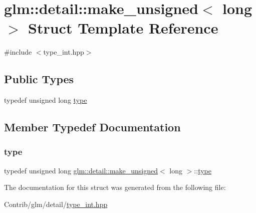 \hypertarget{structglm_1_1detail_1_1make__unsigned_3_01long_01_4}{}\section{glm\+:\+:detail\+:\+:make\+\_\+unsigned$<$ long $>$ Struct Template Reference}
\label{structglm_1_1detail_1_1make__unsigned_3_01long_01_4}


{\ttfamily \#include $<$type\+\_\+int.\+hpp$>$}

\subsection*{Public Types}
\begin{DoxyCompactItemize}
\item 
typedef unsigned long \mbox{\hyperlink{structglm_1_1detail_1_1make__unsigned_3_01long_01_4_ade0cc74f63e30969e7d7b42eb6ac8289}{type}}
\end{DoxyCompactItemize}


\subsection{Member Typedef Documentation}
\mbox{\label{structglm_1_1detail_1_1make__unsigned_3_01long_01_4_ade0cc74f63e30969e7d7b42eb6ac8289}} 
\subsubsection{\texorpdfstring{type}{type}}
{\footnotesize\ttfamily typedef unsigned long \mbox{\hyperlink{structglm_1_1detail_1_1make__unsigned}{glm\+::detail\+::make\+\_\+unsigned}}$<$ long $>$\+::\mbox{\hyperlink{structglm_1_1detail_1_1make__unsigned_3_01long_01_4_ade0cc74f63e30969e7d7b42eb6ac8289}{type}}}



The documentation for this struct was generated from the following file\+:\begin{DoxyCompactItemize}
\item 
Contrib/glm/detail/\mbox{\hyperlink{type__int_8hpp}{type\+\_\+int.\+hpp}}\end{DoxyCompactItemize}
